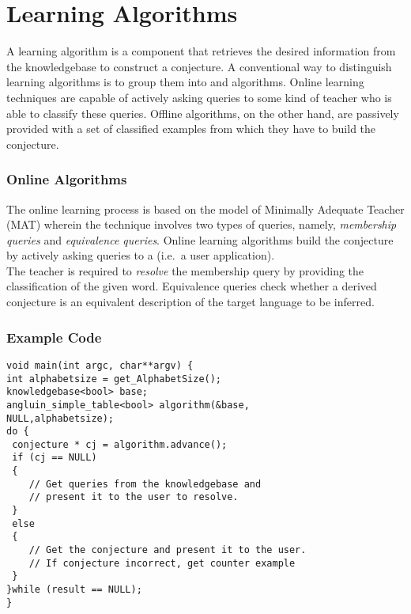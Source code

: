 \chapter{Learning Algorithms}

A learning algorithm is a component that retrieves the desired information from the knowledgebase to construct a conjecture. 
A conventional way to distinguish learning algorithms is to group them into \online and \offline algorithms. Online learning techniques are capable of actively asking queries to some kind of teacher who is able to classify these queries. Offline algorithms, on the other hand, are passively provided with a set of classified examples from which they have to build the conjecture.

\subsection*{Online Algorithms}

 The online learning process is based on the model of Minimally Adequate Teacher (MAT) wherein the technique involves two types of queries, namely, \emph{membership queries} and \emph{equivalence queries}. Online learning algorithms build the conjecture by actively asking queries to a \teacher (i.e.\ a user application). \\ The teacher is required to \emph{resolve} the membership query by providing the classification of the given word. Equivalence queries check whether a derived conjecture is an equivalent description of the target language to be inferred.
\subsection*{Example Code}

\lstset{language=c++, numbers=left, numberstyle=\tiny, stepnumber=1, numbersep=5pt}
\begin{lstlisting}[frame=single]
void main(int argc, char**argv) {
int alphabetsize = get_AlphabetSize();
knowledgebase<bool> base;
angluin_simple_table<bool> algorithm(&base,
NULL,alphabetsize);
do {
 conjecture * cj = algorithm.advance();
 if (cj == NULL) 
 {
    // Get queries from the knowledgebase and 
    // present it to the user to resolve.
 }
 else 
 {
    // Get the conjecture and present it to the user. 
    // If conjecture incorrect, get counter example
 }
}while (result == NULL);
}
\end{lstlisting}


